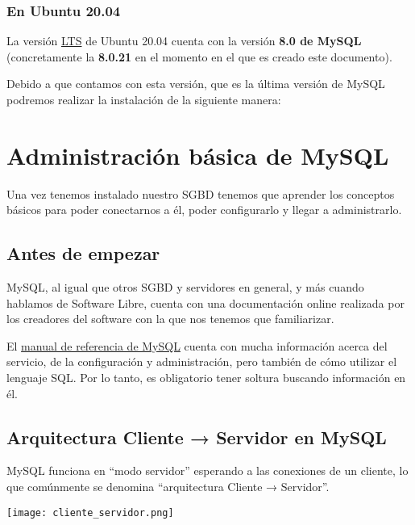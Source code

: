 \subsection{En Ubuntu 20.04}
La versión \hyperlink{lts}{LTS} de Ubuntu 20.04 cuenta con la versión \textbf{8.0 de MySQL} (concretamente la \textbf{8.0.21} en el momento en el que es creado este documento).

Debido a que contamos con esta versión, que es la última versión de MySQL podremos realizar la instalación de la siguiente manera:




\chapter{Administración básica de MySQL}
Una vez tenemos instalado nuestro SGBD tenemos que aprender los conceptos básicos para poder conectarnos a él, poder configurarlo y llegar a administrarlo.

\section{Antes de empezar}
MySQL, al igual que otros SGBD y servidores en general, y más cuando hablamos de Software Libre, cuenta con una documentación online realizada por los creadores del software con la que nos tenemos que familiarizar.

El \href{https://dev.mysql.com/doc/refman/8.0/en/}{manual de referencia de MySQL} cuenta con mucha información acerca del servicio, de la configuración y administración, pero también de cómo utilizar el lenguaje SQL. Por lo tanto, es obligatorio tener soltura buscando información en él.


\section{Arquitectura Cliente → Servidor en MySQL}
MySQL funciona en “modo servidor” esperando a las conexiones de un cliente, lo que comúnmente se denomina “arquitectura Cliente → Servidor”.

\begin{center}
    \vspace{-10pt}
    \texttt{[image: cliente\_servidor.png]}
\end{center}

